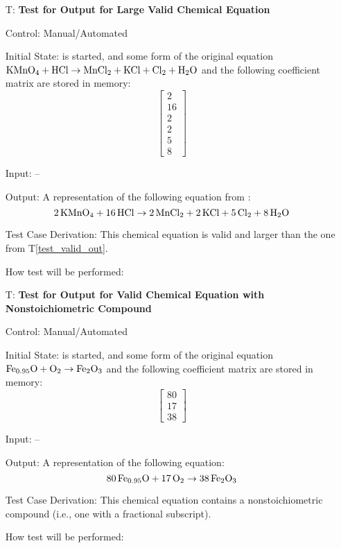 \documentclass[12pt, titlepage]{article}
\newcounter{testnum} %
\newcommand{\testref}[1]{T\ref{#1}}
\begin{document}
\begin{enumerate}
  \item[T\refstepcounter{testnum}\thetestnum \label{test_large_valid_out}:]
    \textbf{Test for Output for Large Valid Chemical Equation}

    Control: Manual/Automated 

    Initial State: \progname{} is started, and some form of the original
    equation $\ce{KMnO4} + \ce{HCl} \rightarrow \ce{MnCl2} + \ce{KCl} +
      \ce{Cl2} + \ce{H2O}$ \cite{taylor_balancing_2021} and the following
    coefficient matrix are stored in memory:
    $$\begin{bmatrix}
        2  \\
        16 \\
        2  \\
        2  \\
        5  \\
        8
      \end{bmatrix}$$

    Input: --

    Output: A representation of the following equation from
    \cite{taylor_balancing_2021}:
    $$\ce{2KMnO4} + \ce{16HCl} \rightarrow \ce{2MnCl2} + \ce{2KCl} +
      \ce{5Cl2} + \ce{8H2O}$$


    Test Case Derivation: This chemical equation is
    valid and larger than the one from \testref{test_valid_out}.

    How test will be performed: 

  \item[T\refstepcounter{testnum}\thetestnum \label{test_nonstoich_valid_out}:]
    \textbf{Test for Output for Valid Chemical Equation with
      Nonstoichiometric Compound}

    Control: Manual/Automated 

    Initial State: \progname{} is started, and some form of the original
    equation $\ce{Fe_{0.95}O} + \ce{O2} \rightarrow \ce{Fe2O3}$
    \cite{doubtnut_when_nodate} and the following
    coefficient matrix are stored in memory:
    $$\begin{bmatrix}
        80 \\
        17 \\
        38
      \end{bmatrix}$$

    Input: --

    Output: A representation of the following equation:
    $$\ce{80Fe_{0.95}O} + \ce{17O2} \rightarrow \ce{38Fe2O3}$$

    Test Case Derivation: This chemical equation
    contains a nonstoichiometric compound (i.e., one with a fractional
    subscript).

    How test will be performed: 

\end{enumerate}
\end{document}
